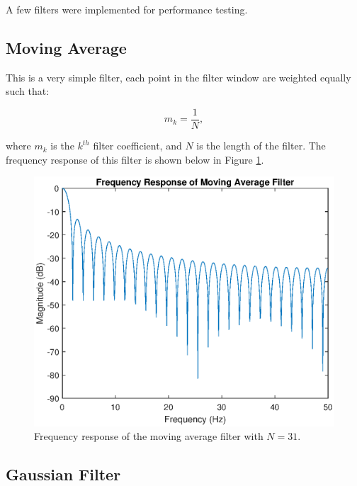             A few filters were implemented for performance testing.

            \subsection{Moving Average}

                This is a very simple filter, each point in the filter window are weighted equally such that:

                \begin{equation}
                    m_k = \frac{1}{N},
                \end{equation}

                where $m_k$ is the $k^{th}$ filter coefficient, and $N$ is the length of the filter. The frequency response of this filter is shown below in Figure \ref{img_cm_filter}.

                \begin{figure}[!th]
                    \includegraphics[width=\textwidth]{Images/cm_filter.eps}
                    \centering
                    \caption{Frequency response of the moving average filter with $N=31$.}
                    \label{img_cm_filter}
                \end{figure}

            \subsection{Gaussian Filter}

